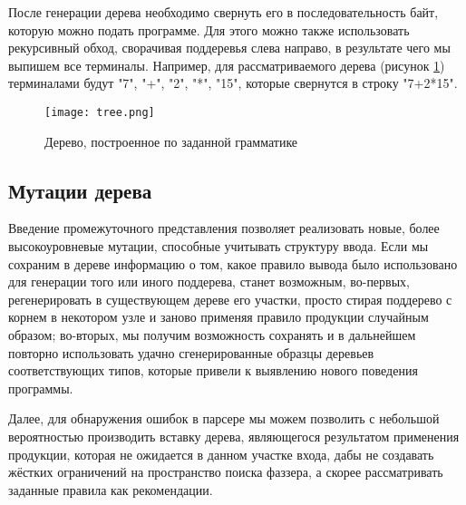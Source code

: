 После генерации дерева необходимо свернуть его в последовательность байт, которую можно подать программе. Для этого можно также использовать рекурсивный обход, сворачивая поддеревья слева направо, в результате чего мы выпишем все терминалы. Например, для рассматриваемого дерева (рисунок \ref{fig:tree_folding}) терминалами будут "7", "+", "2", "*", "15", которые свернутся в строку "7+2*15".

\begin{figure}[h]
	\centering
	\texttt{[image: tree.png]}
	\caption{Дерево, построенное по заданной грамматике}
	\label{fig:tree_folding}
\end{figure}%

\subsection{Мутации дерева}

Введение промежуточного представления позволяет реализовать новые, более высокоуровневые мутации, способные учитывать структуру ввода. Если мы сохраним в дереве информацию о том, какое правило вывода было использовано для генерации того или иного поддерева, станет возможным, во-первых, регенерировать в существующем дереве его участки, просто стирая поддерево с корнем в некотором узле и заново применяя правило продукции случайным образом; во-вторых, мы получим возможность сохранять и в дальнейшем повторно использовать удачно сгенерированные образцы деревьев соответствующих типов, которые привели к выявлению нового поведения программы.

Далее, для обнаружения ошибок в парсере мы можем позволить с небольшой вероятностью производить вставку дерева, являющегося результатом применения продукции, которая не ожидается в данном участке входа, дабы не создавать жёстких ограничений на пространство поиска фаззера, а скорее рассматривать заданные правила как рекомендации.

